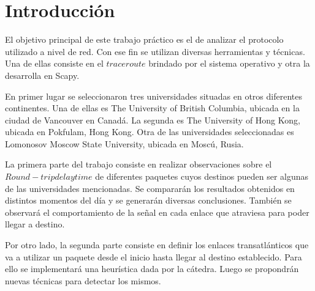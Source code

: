 \section{Introducción}

El objetivo principal de este trabajo práctico es el de analizar el protocolo utilizado a nivel de red. Con ese fin se utilizan diversas herramientas y técnicas. Una de ellas consiste en el $traceroute$ brindado por el sistema operativo y otra la desarrolla en Scapy. 

En primer lugar se seleccionaron tres universidades situadas en otros diferentes continentes. Una de ellas 
es The University of British Columbia, ubicada en la ciudad de Vancouver en Canadá. La segunda es The University of Hong Kong, ubicada en Pokfulam, Hong Kong. Otra de las universidades seleccionadas es Lomonosov Moscow State University, ubicada en Moscú, Rusia. 

La primera parte del trabajo consiste en realizar observaciones sobre el $Round-trip delay time$ de diferentes paquetes cuyos destinos pueden ser algunas de las universidades mencionadas. Se compararán los resultados obtenidos en distintos momentos del día y se generarán diversas conclusiones. También se observará el comportamiento de la señal en cada enlace que atraviesa para poder llegar a destino. 

Por otro lado, la segunda parte consiste en definir los enlaces transatlánticos que va a utilizar un paquete desde el inicio hasta llegar al destino establecido. Para ello se implementará una heurística dada por la cátedra. Luego se propondrán nuevas técnicas para detectar los mismos. 
